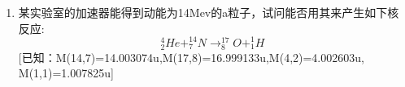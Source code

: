 \begin{enumerate}
(1)试写出此时铍原子可能形成哪些原子态(能级)？已知电子间是L-S合。\\
(2)按这些原子态(能级)能量的大小，定性画出能级的排列顺序，并标出各能级的原子态符号。\\
(3）上述这些能级之间能否产生原子跃迁？如能,请写出哪些原子态之间可以产生跃迁？如不能，请回答为什么。\\
(4)若将铍原子置于弱磁场中,则原能量最高与最低的两个能级各将分裂为几个能级？画出示意图。
\item 某实验室的加速器能得到动能为14Mev的a粒子，试问能否用其来产生如下核反应:\begin{equation}
^4_2He+ ^{14}_7N \to ^{17}_8O+^1_1H~
\end{equation}
[已知：M(14,7)=14.003074u,M(17,8)=16.999133u,M(4,2)=4.002603u, M(1,1)=1.007825u]
\end{enumerate}